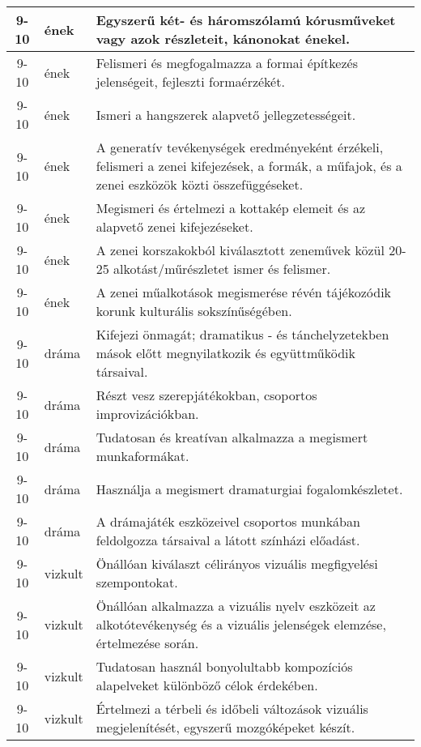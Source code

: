 \begin{small}
\begin{longtable}{c | p{2cm} |  p{11cm} }
              9-10 & ének & Egyszerű két- és háromszólamú kórusműveket vagy azok részleteit, kánonokat énekel. \\ \hline
              9-10 & ének & Felismeri és megfogalmazza a formai építkezés jelenségeit, fejleszti formaérzékét. \\ \hline
              9-10 & ének & Ismeri a hangszerek alapvető jellegzetességeit. \\ \hline
              9-10 & ének & A generatív tevékenységek eredményeként érzékeli, felismeri a zenei kifejezések, a formák, a műfajok, és a zenei eszközök közti összefüggéseket. \\ \hline
              9-10 & ének & Megismeri és értelmezi a kottakép elemeit és az alapvető zenei kifejezéseket. \\ \hline
              9-10 & ének & A zenei korszakokból kiválasztott zeneművek közül 20-25 alkotást/műrészletet ismer és felismer. \\ \hline
              9-10 & ének & A zenei műalkotások megismerése révén tájékozódik korunk kulturális sokszínűségében. \\ \hline
              9-10 & dráma & Kifejezi önmagát; dramatikus - és tánchelyzetekben mások előtt megnyilatkozik és együttműködik társaival. \\ \hline
              9-10 & dráma & Részt vesz szerepjátékokban, csoportos improvizációkban. \\ \hline
              9-10 & dráma & Tudatosan és kreatívan alkalmazza a megismert munkaformákat. \\ \hline
              9-10 & dráma & Használja a megismert dramaturgiai fogalomkészletet. \\ \hline
              9-10 & dráma & A drámajáték eszközeivel csoportos munkában feldolgozza társaival a látott színházi előadást. \\ \hline
              9-10 & vizkult & Önállóan kiválaszt célirányos vizuális megfigyelési szempontokat. \\ \hline
              9-10 & vizkult & Önállóan alkalmazza a vizuális nyelv eszközeit az alkotótevékenység és a vizuális jelenségek elemzése, értelmezése során. \\ \hline
              9-10 & vizkult & Tudatosan használ bonyolultabb kompozíciós alapelveket különböző célok érdekében. \\ \hline
              9-10 & vizkult & Értelmezi a térbeli és időbeli változások vizuális megjelenítését, egyszerű mozgóképeket készít. \\ \hline

\end{longtable}
\end{small}
